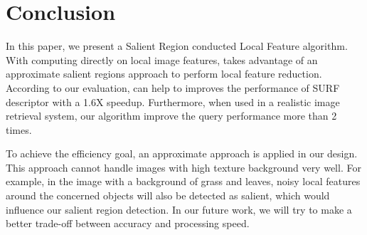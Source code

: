 \section{Conclusion}
\label{sec:conclusion}

In this paper, we present a Salient Region conducted Local Feature algorithm. With computing directly on local image features, {\sys} takes advantage of an approximate salient regions approach to perform local feature reduction. According to our evaluation, {\sys} can help to improves the performance of SURF descriptor with a 1.6X speedup. Furthermore, when used in a realistic image retrieval system, our algorithm improve the query performance more than 2 times. 

To achieve the efficiency goal, an approximate approach is applied in our design. This approach cannot handle images with high texture background very well. For example, in the image with a background of grass and leaves, noisy local features around the concerned objects will also be detected as salient, which would influence our salient region detection. In our future work, we will try to make a better trade-off between accuracy and processing speed.